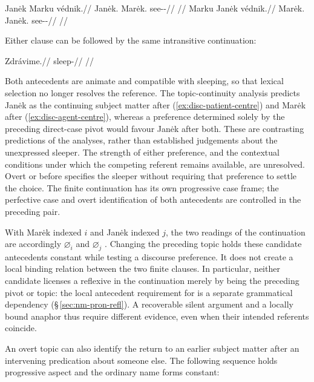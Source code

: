 \pex\label{ex:disc-animate-competition}
\a\label{ex:disc-patient-centre}%
\begingl
\gla Janėk Marku védnik.//
\glb Janėk.\Dir{} Marėk.\Trs{} see-\Trs{}-\Pf{}//
\glft {}
 //
\endgl
\a\label{ex:disc-agent-centre}%
\begingl
\gla Marku Janėk védnik.//
\glb Marėk.\Trs{} Janėk.\Dir{} see-\Trs{}-\Pf{}//
\glft {}
 //
\endgl
\xe

\noindent Either clause can be followed by the same intransitive continuation:

\ex\label{ex:disc-ambiguous-continuation}%
\begingl
\gla Zdrávime.//
\glb sleep-\Prog{}//
\glft {}//
\endgl
\xe

\noindent Both antecedents are animate and compatible with sleeping, so that
 lexical selection no longer resolves the reference. The topic-continuity
 analysis predicts Janėk as the continuing subject matter after
 (\ref{ex:disc-patient-centre}) and Marėk after
 (\ref{ex:disc-agent-centre}), whereas a preference determined solely by the
 preceding direct-case pivot would favour Janėk after both. These are
 contrasting predictions of the analyses, rather than established judgements
 about the unexpressed sleeper. The strength of either preference, and the
 contextual conditions under which the competing referent remains available,
 are unresolved. Overt  or  before 
 specifies the sleeper without requiring that preference to settle the choice.
 The finite continuation has its own progressive case frame; the perfective
 case and overt identification of both antecedents are controlled in the
 preceding pair.

With Marėk indexed $i$ and Janėk indexed $j$, the two readings of the
continuation are accordingly $\varnothing_i$  and
$\varnothing_j$ . Changing the preceding topic holds these
candidate antecedents constant while testing a discourse preference. It does
not create a local binding relation between the two finite clauses. In
particular, neither candidate licenses a reflexive in the continuation merely
by being the preceding pivot or topic: the local antecedent requirement for
 is a separate grammatical dependency
(§\,\ref{sec:nm-pron-refl}). A recoverable silent argument and a locally
bound anaphor thus require different evidence, even when their intended
referents coincide.

An overt topic can also identify the return to an earlier subject matter
 after an intervening predication about someone else. The following sequence
 holds progressive aspect and the ordinary name forms constant:

